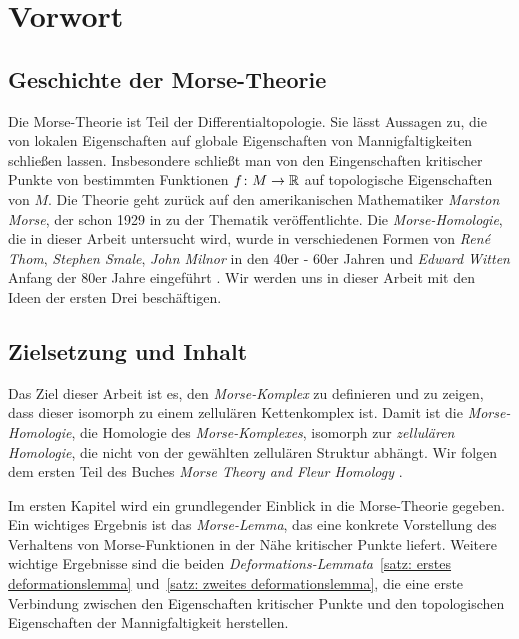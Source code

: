 \documentclass[a4paper,11pt,twoside]{scrreport}
\begin{document}
\cleardoublepage

\section*{Vorwort}

\subsection*{Geschichte der Morse-Theorie}

Die Morse-Theorie ist Teil der Differentialtopologie. Sie lässt Aussagen zu, die von lokalen 
Eigenschaften auf globale Eigenschaften von Mannigfaltigkeiten schließen lassen. Insbesondere schließt man
von den Eingenschaften kritischer Punkte von bestimmten Funktionen $f \colon M \to { \mathbb R }$ auf topologische 
Eigenschaften von $M$. 
Die Theorie geht zurück auf den amerikanischen Mathematiker \textit{Marston Morse}, 
der schon 1929 in \cite{morse} zu der Thematik veröffentlichte. Die \textit{Morse-Homologie}, die in dieser 
Arbeit untersucht wird, wurde in verschiedenen Formen von \textit{René Thom}, \textit{Stephen Smale},
\textit{John Milnor} in den 40er - 60er Jahren und \textit{Edward Witten} Anfang der 80er Jahre 
eingeführt \cite{yanfeng}. Wir werden uns in dieser Arbeit mit den Ideen der ersten Drei beschäftigen.

\subsection*{Zielsetzung und Inhalt}

Das Ziel dieser Arbeit ist es, den \textit{Morse-Komplex} zu definieren und zu zeigen, dass dieser 
isomorph zu einem zellulären Kettenkomplex ist. Damit ist die \textit{Morse-Homologie}, die Homologie des 
\textit{Morse-Komplexes}, isomorph zur \textit{zellulären Homologie}, die nicht von der gewählten 
zellulären Struktur abhängt. Wir folgen dem ersten Teil des Buches 
\textit{Morse Theory and Fleur Homology} \cite{audin}. 

Im ersten Kapitel wird ein grundlegender Einblick in die Morse-Theorie gegeben. Ein wichtiges Ergebnis ist
das \textit{Morse-Lemma}, das eine konkrete Vorstellung des Verhaltens von Morse-Funktionen in der Nähe 
kritischer Punkte liefert. Weitere wichtige Ergebnisse sind die beiden 
\textit{Deformations-Lemmata}~\ref{satz: erstes deformationslemma} und~\ref{satz: zweites deformationslemma},
die eine erste Verbindung zwischen den Eigenschaften kritischer Punkte und den topologischen Eigenschaften
der Mannigfaltigkeit herstellen.
\end{document}
